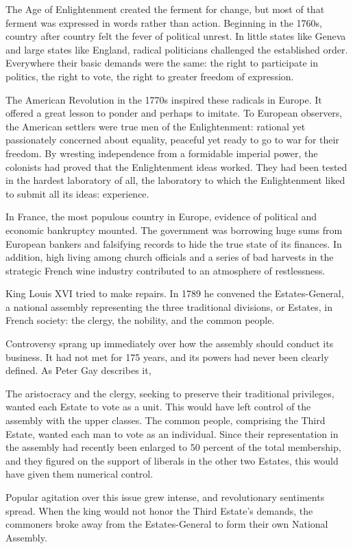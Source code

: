 The Age of Enlightenment created the ferment for change, but most of that ferment was expressed in
words rather than action. Beginning in the 1760s, country after country felt the fever of political
unrest. In little states like Geneva and large states like England, radical politicians challenged
the established order. Everywhere their basic demands were the same: the right to participate in
politics, the right to vote, the right to greater freedom of expression.

The American Revolution in the 1770s inspired these radicals in Europe. It offered a great lesson to
ponder and perhaps to imitate. To European observers, the American settlers were true men of the
Enlightenment: rational yet passionately concerned about equality, peaceful yet ready to go to war
for their freedom. By wresting independence from a formidable imperial power, the colonists had
proved that the Enlightenment ideas worked. They had been tested in the hardest laboratory of all,
the laboratory to which the Enlightenment liked to submit all its ideas: experience.

In France, the most populous country in Europe, evidence of political and economic bankruptcy
mounted. The government was borrowing huge sums from European bankers and falsifying records to hide
the true state of its finances. In addition, high living among church officials and a series of bad
harvests in the strategic French wine industry contributed to an atmosphere of restlessness.

King Louis XVI tried to make repairs. In 1789 he convened the Estates-General, a national assembly
representing the three traditional divisions, or Estates, in French society: the clergy, the
nobility, and the common people.

Controversy sprang up immediately over how the assembly should conduct its business. It had not met
for 175 years, and its powers had never been clearly defined. As Peter Gay describes it,

\begin{blockquote}
The aristocracy and the clergy, seeking to preserve their traditional privileges, wanted each Estate
to vote as a unit. This would have left control of the assembly with the upper classes. The common
people, comprising the Third Estate, wanted each man to vote as an individual. Since their
representation in the assembly had recently been enlarged to 50 percent of the total membership, and
they figured on the support of liberals in the other two Estates, this would have given them
numerical control.

Popular agitation over this issue grew intense, and revolutionary sentiments spread. When the king
would not honor the Third Estate’s demands, the commoners broke away from the Estates-General to
form their own National Assembly.
\end{blockquote}

